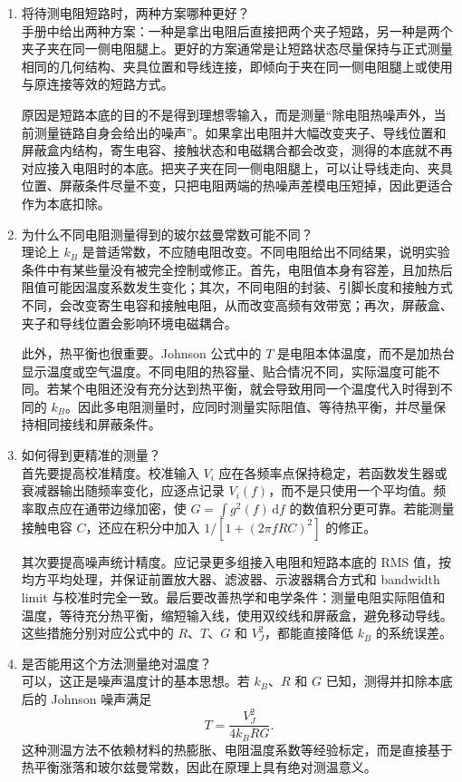 \documentclass[11pt]{article}
\begin{document}
\begin{enumerate}
    \item 将待测电阻短路时，两种方案哪种更好？\\
    手册中给出两种方案：一种是拿出电阻后直接把两个夹子短路，另一种是两个夹子夹在同一侧电阻腿上。更好的方案通常是让短路状态尽量保持与正式测量相同的几何结构、夹具位置和导线连接，即倾向于夹在同一侧电阻腿上或使用与原连接等效的短路方式。

    原因是短路本底的目的不是得到理想零输入，而是测量“除电阻热噪声外，当前测量链路自身会给出的噪声”。如果拿出电阻并大幅改变夹子、导线位置和屏蔽盒内结构，寄生电容、接触状态和电磁耦合都会改变，测得的本底就不再对应接入电阻时的本底。把夹子夹在同一侧电阻腿上，可以让导线走向、夹具位置、屏蔽条件尽量不变，只把电阻两端的热噪声差模电压短掉，因此更适合作为本底扣除。

    \item 为什么不同电阻测量得到的玻尔兹曼常数可能不同？\\
    理论上 $k_B$ 是普适常数，不应随电阻改变。不同电阻给出不同结果，说明实验条件中有某些量没有被完全控制或修正。首先，电阻值本身有容差，且加热后阻值可能因温度系数发生变化；其次，不同电阻的封装、引脚长度和接触方式不同，会改变寄生电容和接触电阻，从而改变高频有效带宽；再次，屏蔽盒、夹子和导线位置会影响环境电磁耦合。

    此外，热平衡也很重要。Johnson 公式中的 $T$ 是电阻本体温度，而不是加热台显示温度或空气温度。不同电阻的热容量、贴合情况不同，实际温度可能不同。若某个电阻还没有充分达到热平衡，就会导致用同一个温度代入时得到不同的 $k_B$。因此多电阻测量时，应同时测量实际阻值、等待热平衡，并尽量保持相同接线和屏蔽条件。

    \item 如何得到更精准的测量？\\
    首先要提高校准精度。校准输入 $V_i$ 应在各频率点保持稳定，若函数发生器或衰减器输出随频率变化，应逐点记录 $V_i(f)$，而不是只使用一个平均值。频率取点应在通带边缘加密，使 $G=\int g^2(f)\,\mathrm df$ 的数值积分更可靠。若能测量接触电容 $C$，还应在积分中加入 $1/[1+(2\pi fRC)^2]$ 的修正。

    其次要提高噪声统计精度。应记录更多组接入电阻和短路本底的 RMS 值，按均方平均处理，并保证前置放大器、滤波器、示波器耦合方式和 bandwidth limit 与校准时完全一致。最后要改善热学和电学条件：测量电阻实际阻值和温度，等待充分热平衡，缩短输入线，使用双绞线和屏蔽盒，避免移动导线。这些措施分别对应公式中的 $R$、$T$、$G$ 和 $V_J^2$，都能直接降低 $k_B$ 的系统误差。

    \item 是否能用这个方法测量绝对温度？\\
    可以，这正是噪声温度计的基本思想。若 $k_B$、$R$ 和 $G$ 已知，测得并扣除本底后的 Johnson 噪声满足
    \begin{equation}
        T=\frac{V_J^2}{4k_BRG}.
    \end{equation}
    这种测温方法不依赖材料的热膨胀、电阻温度系数等经验标定，而是直接基于热平衡涨落和玻尔兹曼常数，因此在原理上具有绝对测温意义。


\end{enumerate}
\end{document}
